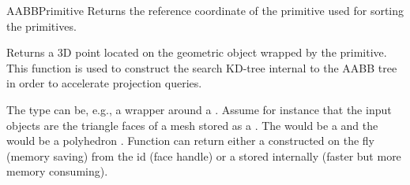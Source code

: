 \begin{ccRefConcept}{AABBPrimitive}
{Returns the  reference coordinate of the primitive used for sorting the primitives.}

{Returns a 3D point located on the geometric object wrapped by the primitive. This function is used to construct the search KD-tree internal to the AABB tree in order to accelerate projection queries.}

\ccSeeAlso
{}

\ccExample

The  type can be, e.g., a wrapper around a . Assume for instance that the input objects are the triangle faces of a mesh stored as a . The  would be a  and the  would be a polyhedron . Function  can return either a  constructed on the fly (memory saving) from the id (face handle) or a  stored internally (faster but more memory consuming). 

\end{ccRefConcept}

\ccRefPageEnd

